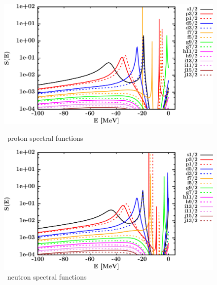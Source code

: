 \begin{figure}[hbtp]
    \centering
    \begin{minipage}{0.42\textwidth}
        \centering
        \includegraphics[width=\textwidth]{figures/ni64_protonSpectralFunctions.png}
        \caption*{\niFour\ proton spectral functions}
        \label{DOMFitData_ni64_proton_spectralFunctions}
    \end{minipage}\hspace{6pt}
    \begin{minipage}{0.42\textwidth}
        \centering
        \includegraphics[width=\linewidth]{figures/ni64_neutronSpectralFunctions.png}
        \caption*{\niFour\ neutron spectral functions}
        \label{DOMFitData_ni64_neutron_spectralFunctions}
    \end{minipage}
\end{figure}

